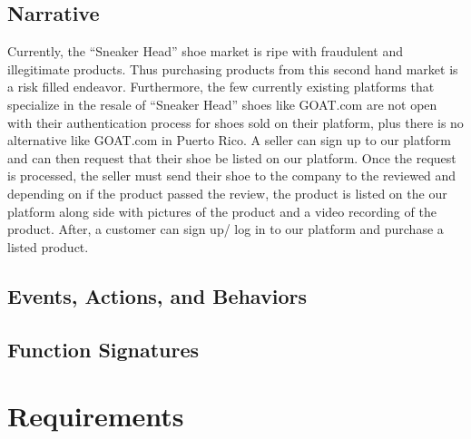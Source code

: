 \subsection{Narrative}
\hspace{1cm} Currently, the ``Sneaker Head'' shoe market is ripe with fraudulent and illegitimate products. Thus purchasing products from this second hand market is a risk filled endeavor. Furthermore, the few currently existing platforms that specialize in the resale of ``Sneaker Head'' shoes like GOAT.com are not open with their authentication process for shoes sold on their platform, plus there is no alternative like GOAT.com in Puerto Rico. A seller can sign up to our platform and can then request that their shoe be listed on our platform. Once the request is processed, the seller must send their shoe to the company to the reviewed and depending on if the product passed the review, the product is listed on the our platform along side with pictures of the product and a video recording of the product. After, a customer can sign up/ log in to our platform and purchase a listed product.
\subsection{Events, Actions, and Behaviors}
\subsection{Function Signatures}
\newpage
\section{Requirements}
